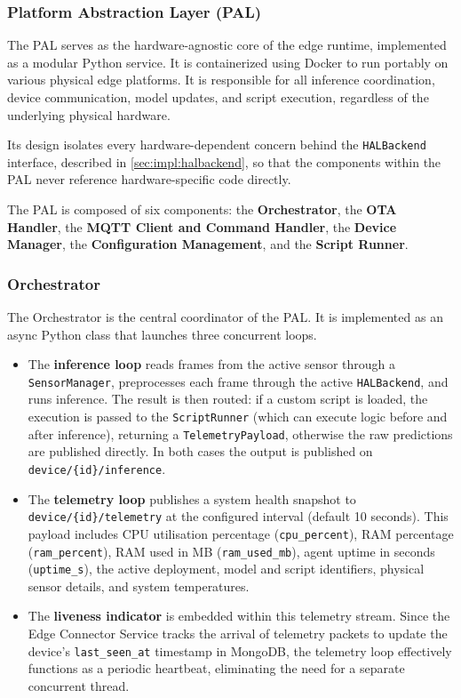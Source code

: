 \subsubsection{Platform Abstraction Layer (\texorpdfstring{\acrshort{PAL}}{PAL})}\label{sec:impl:pal}

The \gls{PAL} serves as the hardware-agnostic core of the edge runtime, implemented as a modular Python service. It is containerized using Docker to run portably on various physical edge platforms. It is responsible for all inference coordination, device communication, model updates, and script execution, regardless of the underlying physical hardware. 

Its design isolates every hardware-dependent concern behind the \texttt{HALBackend} interface, described in \autoref{sec:impl:halbackend}, so that the components within the \gls{PAL} never reference hardware-specific code directly.

The \gls{PAL} is composed of six components: the \textbf{Orchestrator}, the \textbf{\gls{OTA} Handler}, the \textbf{\gls{MQTT} Client and Command Handler}, the \textbf{Device Manager}, the \textbf{Configuration Management}, and the \textbf{Script Runner}.

\subsubsection{Orchestrator}\label{sec:impl:orchestrator}

The Orchestrator is the central coordinator of the \gls{PAL}. It is implemented as an async Python class that launches three concurrent loops.
\begin{itemize}
    \item The \textbf{inference loop} reads frames from the active sensor through a \texttt{SensorManager}, preprocesses each frame through the active \texttt{HALBackend}, and runs inference. The result is then routed: if a custom script is loaded, the execution is passed to the \texttt{ScriptRunner} (which can execute logic before and after inference), returning a \texttt{TelemetryPayload}, otherwise the raw predictions are published directly. In both cases the output is published on \texttt{device/\{id\}/inference}.
    \item The \textbf{telemetry loop} publishes a system health snapshot to \texttt{device/\{id\}/telemetry} at the configured interval (default 10 seconds). This payload includes \gls{CPU} utilisation percentage (\texttt{cpu\_percent}), \gls{RAM} percentage (\texttt{ram\_percent}), \gls{RAM} used in MB (\texttt{ram\_used\_mb}), agent uptime in seconds (\texttt{uptime\_s}), the active deployment, model and script identifiers, physical sensor details, and system temperatures.
    \item The \textbf{liveness indicator} is embedded within this telemetry stream. Since the Edge Connector Service tracks the arrival of telemetry packets to update the device's \texttt{last\_seen\_at} timestamp in MongoDB, the telemetry loop effectively functions as a periodic heartbeat, eliminating the need for a separate concurrent thread.
\end{itemize}

